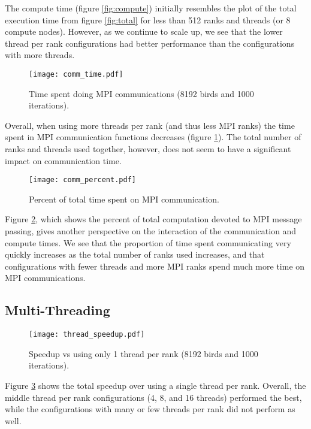 The compute time (figure \ref{fig:compute}) initially resembles the plot of the total
execution time from figure \ref{fig:total} for less than 512 ranks and threads (or
8 compute nodes). However, as we continue to scale up, we see that the lower
thread per rank configurations had better performance than the configurations
with more threads.

\begin{figure}[h!]
  \centering
  \texttt{[image: comm\_time.pdf]}
  \caption{Time spent doing MPI communications (8192 birds and 1000 iterations).\label{fig:comm}}
\end{figure}

Overall, when using more threads per rank (and thus less MPI ranks) the time
spent in MPI communication functions decreases (figure \ref{fig:comm}). The total
number of ranks and threads used together, however, does not seem to have a
significant impact on communication time.

\begin{figure}[h!]
  \centering
  \texttt{[image: comm\_percent.pdf]}
  \caption{Percent of total time spent on MPI communication.\label{fig:commpercent}}
\end{figure}

Figure \ref{fig:commpercent}, which shows the percent of total computation
devoted to MPI message passing, gives another perspective on the interaction of the
communication and compute times. We see that the proportion of time spent
communicating very quickly increases as the total number of ranks used increases,
and that configurations with fewer threads and more MPI ranks spend much more time
on MPI communications.

\subsection*{Multi-Threading}
\FloatBarrier
\begin{figure}[h!]
  \centering
  \texttt{[image: thread\_speedup.pdf]}
  \caption{Speedup vs using only 1 thread per rank (8192 birds and 1000 iterations).\label{fig:threads}}
\end{figure}

Figure \ref{fig:threads} shows the total speedup over using a single thread per rank.
Overall, the middle thread per rank configurations (4, 8, and 16 threads)
performed the best, while the configurations with many or few threads per rank did
not perform as well.

